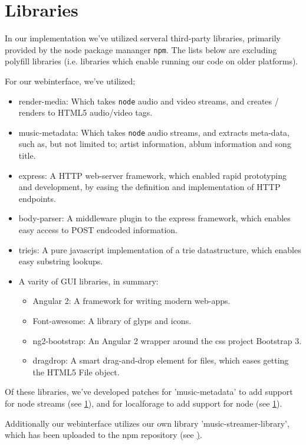 \section{Libraries}

In our implementation we've utilized serveral third-party libraries, primarily
provided by the node package mananger \verb|npm|. The lists below are excluding
polyfill libraries (i.e. libraries which enable running our code on older
platforms).

For our webinterface, we've utilized;
\begin{itemize}
\item render-media: Which takes \verb|node| audio and video streams, and
        creates / renders to HTML5 audio/video tags.
\item music-metadata: Which takes \verb|node| audio streams, and extracts
        meta-data, such as, but not limited to; artist information, ablum 
        information and song title.
\item express: A HTTP web-server framework, which enabled rapid prototyping and
        development, by easing the definition and implementation of HTTP endpoints.
\item body-parser: A middleware plugin to the express framework, which enables 
        easy access to POST endcoded information.
\item triejs: A pure javascript implementation of a trie datastructure, which 
        enables easy substring lookups.
\item A varity of GUI libraries, in summary:
\begin{itemize}
\item Angular 2: A framework for writing modern web-apps.
\item Font-awesome: A library of glyps and icons.
\item ng2-bootstrap: An Angular 2 wrapper around the css project Bootstrap 3.
\item dragdrop: A smart drag-and-drop element for files, which eases getting
        the HTML5 File object.
\end{itemize}
\end{itemize}
Of these libraries, we've developed patches for 'music-metadata' to add support
for node streams (see \ref{}), and for localforage to add support for node (see
\ref{}).

Additionally our webinterface utilizes our own library 'music-streamer-library',
which has been uploaded to the npm repository (see \href{}).

